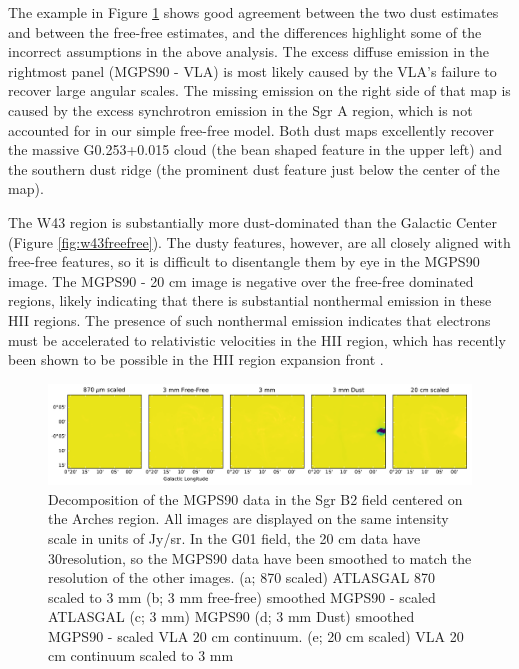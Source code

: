 \documentclass[twocolumn]{aastex62}
\begin{document}

The example in Figure \ref{fig:arches_freefree} shows good agreement between the
two dust estimates and between the free-free estimates, and the differences
highlight some of the incorrect assumptions in the above analysis.  The excess
diffuse emission in the rightmost panel (MGPS90 - VLA) is most likely caused by
the VLA's failure to recover large angular scales.  The missing emission on the
right side of that map is caused by the excess synchrotron emission in the Sgr
A region, which is not accounted for in our simple free-free model.  Both dust
maps excellently recover the massive G0.253+0.015 cloud (the bean shaped
feature in the upper left) and the southern dust ridge (the prominent dust feature
just below the center of the map).

The W43 region is substantially more dust-dominated than the Galactic Center
(Figure \ref{fig:w43freefree}).  The dusty features, however, are all closely
aligned with free-free features, so it is difficult to disentangle them by eye
in the MGPS90 image.  The MGPS90 - 20 cm image is negative over the free-free
dominated regions, likely indicating that there is substantial nonthermal
emission in these HII regions.  The presence of such nonthermal emission
indicates that electrons must be accelerated to relativistic velocities in the
HII region, which has recently been shown to be possible in the HII region
expansion front \citep{Padovani2019a}.



\begin{figure}[htp]
    \includegraphics[width=17cm]{figures/G01_arches_5panel.pdf}
    \caption{Decomposition of the MGPS90 data in the Sgr B2 field centered on the Arches region. 
    All images are displayed on the same intensity scale in units of Jy/sr.  In the G01 field,
    the 20 cm data have 30\arcsec resolution, so the MGPS90 data have been smoothed to match
    the resolution of the other images.
    (a; 870 \um scaled) ATLASGAL 870 \um scaled to 3 mm
    (b; 3 mm free-free) smoothed MGPS90 - scaled ATLASGAL
    (c; 3 mm) MGPS90 
    (d; 3 mm Dust) smoothed MGPS90 - scaled VLA 20 cm continuum.
    (e; 20 cm scaled) VLA 20 cm continuum scaled to 3 mm
}
\label{fig:arches_freefree}
\end{figure}
\end{document}
